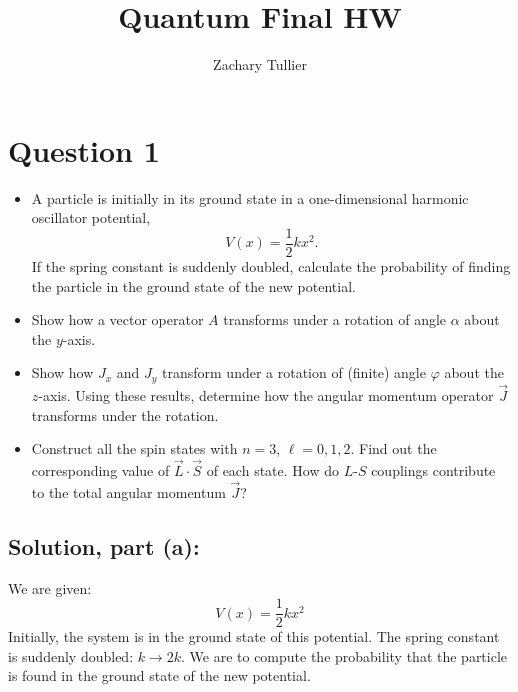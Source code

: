 \documentclass[12pt]{article}
\begin{document}
\singlespacing  %
\title{Quantum Final HW}

\author[1]{Zachary Tullier}
\date{}
\maketitle

\section{Question 1}
    \begin{itemize}
        \item [(a)] A particle is initially in its ground state in a one-dimensional harmonic oscillator potential,
        \[
            V(x) = \frac{1}{2} k x^2.
        \]
        If the spring constant is suddenly doubled, calculate the probability of finding the particle in the ground state of the new potential.
        \item [(b)] Show how a vector operator \( A \) transforms under a rotation of angle \( \alpha \) about the \( y \)-axis.
        \item [(c)] Show how \( J_x \) and \( J_y \) transform under a rotation of (finite) angle \( \varphi \) about the \( z \)-axis. Using these results, determine how the angular momentum operator \( \vec{J} \) transforms under the rotation.
        \item [(d)] Construct all the spin states with \( n = 3 \), \( \ell = 0, 1, 2 \). Find out the corresponding value of \( \vec{L} \cdot \vec{S} \) of each state. How do \( L \)-\( S \) couplings contribute to the total angular momentum \( \vec{J} \)?
    \end{itemize}

    \subsection{Solution, part (a):}
        We are given:
        \[
            V(x) = \frac{1}{2} kx^2
        \]
        Initially, the system is in the ground state of this potential. The spring constant is suddenly doubled: \( k \to 2k \). We are to compute the probability that the particle is found in the ground state of the new potential.
        
\end{document}
